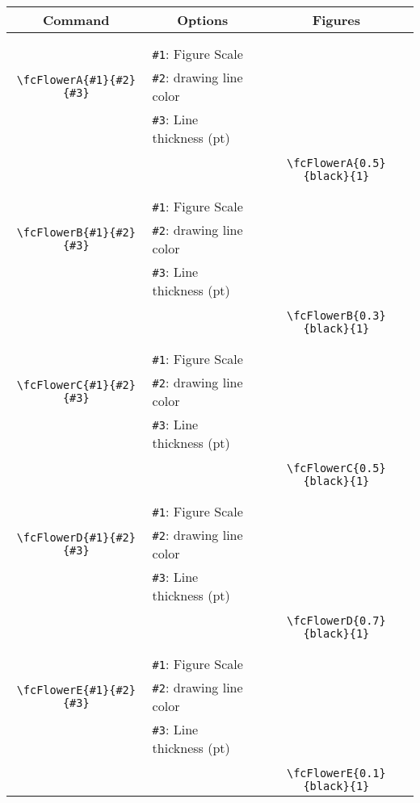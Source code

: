 \documentclass{article}
\begin{document}
\begin{table}[H]\centering\begin{tabular}{|c|l|c|}\hline {\bf Command}& \multicolumn{1}{c|}{{\bf Options}} & {\bf Figures}\\  \hline	&&\multirow{5}{*}{\fcFlowerA{0.5}{black}{1}}\\	&&\\	&\verb|#1|: Figure Scale &\\	\verb|\fcFlowerA{#1}{#2}{#3}|&	\verb|#2|: drawing line color &\\	&\verb|#3|: Line thickness (pt) &\\ &&\\&&	\verb|\fcFlowerA{0.5}{black}{1}|\\\hline 	
	&&\multirow{5}{*}{\fcFlowerB{0.3}{black}{1}}\\	&&\\	&\verb|#1|: Figure Scale &\\	\verb|\fcFlowerB{#1}{#2}{#3}|&	\verb|#2|: drawing line color &\\	&\verb|#3|: Line thickness (pt) &\\ &&\\&&	\verb|\fcFlowerB{0.3}{black}{1}|\\\hline 	
	&&\multirow{5}{*}{\fcFlowerC{0.5}{black}{1}}\\	&&\\	&\verb|#1|: Figure Scale &\\	\verb|\fcFlowerC{#1}{#2}{#3}|&	\verb|#2|: drawing line color &\\	&\verb|#3|: Line thickness (pt) &\\ &&\\&&	\verb|\fcFlowerC{0.5}{black}{1}|\\\hline 	
	&&\multirow{5}{*}{\fcFlowerD{0.7}{black}{1}}\\	&&\\	&\verb|#1|: Figure Scale &\\	\verb|\fcFlowerD{#1}{#2}{#3}|&	\verb|#2|: drawing line color &\\	&\verb|#3|: Line thickness (pt) &\\ &&\\&&	\verb|\fcFlowerD{0.7}{black}{1}|\\\hline 	
	&&\multirow{5}{*}{\fcFlowerE{0.1}{black}{1}}\\	&&\\	&\verb|#1|: Figure Scale &\\	\verb|\fcFlowerE{#1}{#2}{#3}|&	\verb|#2|: drawing line color &\\	&\verb|#3|: Line thickness (pt) &\\ &&\\&&	\verb|\fcFlowerE{0.1}{black}{1}|\\\hline 	

\end{tabular}
\end{table}
\end{document}
